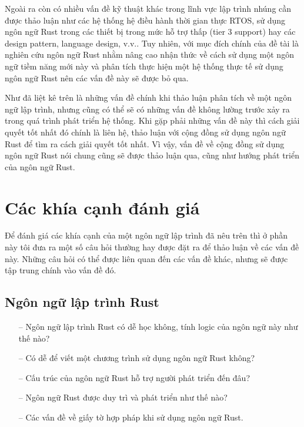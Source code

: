 Ngoài ra còn có nhiều vấn đề kỹ thuật khác trong lĩnh vực lập trình nhúng cần được thảo luận như các hệ thống hệ điều hành thời gian thực RTOS, sử dụng ngôn ngữ Rust trong các thiết bị trong mức hỗ trợ thấp (tier 3 support) hay các design pattern, language design, v.v..
Tuy nhiên, với mục đích chính của đề tài là nghiên cứu ngôn ngữ Rust nhằm nâng cao nhận thức về cách sử dụng một ngôn ngữ tiềm năng mới này và phân tích thực hiện một hệ thống thực tế sử dụng ngôn ngữ Rust nên các vấn đề này sẽ được bỏ qua.

Như đã liệt kê trên là những vấn đề chính khi thảo luận phân tích về một ngôn ngữ lập trình, nhưng cũng có thể sẽ có những vấn đề không lường trước xảy ra trong quá trình phát triển hệ thống.
Khi gặp phải những vấn đề này thì cách giải quyết tốt nhất đó chính là liên hệ, thảo luận với cộng đồng sử dụng ngôn ngữ Rust để tìm ra cách giải quyết tốt nhất.
Vì vậy, vấn đề về cộng đồng sử dụng ngôn ngữ Rust nói chung cũng sẽ được thảo luận qua, cũng như hướng phát triển của ngôn ngữ Rust.

\section{Các khía cạnh đánh giá}
Để đánh giá các khía cạnh của một ngôn ngữ lập trình đã nêu trên thì ở phần này tôi đưa ra một số câu hỏi thường hay được đặt ra để thảo luận về các vấn đề này. Những câu hỏi có thể được liên quan đến các vấn đề khác, nhưng sẽ được tập trung chính vào vấn đề đó.
\subsection{Ngôn ngữ lập trình Rust}
\begin{itemize}
    \item[--] Ngôn ngữ lập trình Rust có dễ học không, tính logic của ngôn ngữ này như thế nào?
    \item[--] Có dễ để viết một chương trình sử dụng ngôn ngữ Rust không?
    \item[--] Cấu trúc của ngôn ngữ Rust hỗ trợ người phát triển đến đâu?
    \item[--] Ngôn ngữ Rust được duy trì và phát triển như thế nào?
    \item[--] Các vấn đề về giấy tờ hợp pháp khi sử dụng ngôn ngữ Rust.
\end{itemize}

